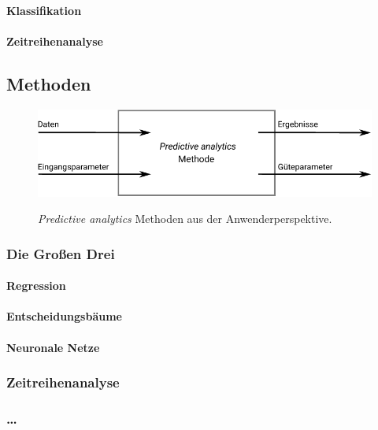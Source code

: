 \paragraph{Klassifikation}

\paragraph{Zeitreihenanalyse}

\subsection{Methoden}

\begin{figure}%
\centering
\caption{\emph{Predictive analytics} Methoden aus der Anwenderperspektive.}
\includegraphics[scale=1.0]{Grafiken/PA_Methoden_Ink.pdf} 
\label{pic:PA_Methoden}
\end{figure}

\subsubsection{Die Großen Drei}

\paragraph{Regression}

\paragraph{Entscheidungsbäume}

\paragraph{Neuronale Netze}

\subsubsection{Zeitreihenanalyse}

\subsubsection{\ldots}

